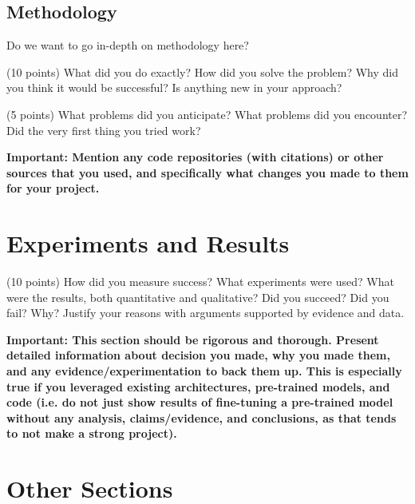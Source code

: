 \documentclass[10pt,twocolumn,letterpaper]{article}
\begin{document}
\subsection{Methodology}

Do we want to go in-depth on methodology here?

(10 points) What did you do exactly? How did you solve the problem? Why did you think it would be successful? Is anything new in your approach? 

(5 points) What problems did you anticipate? What problems did you encounter? Did the very first thing you tried work? 

\textbf{Important: Mention any code repositories (with citations) or other sources that you used, and specifically what changes you made to them for your project. }

\section{Experiments and Results}

(10 points) How did you measure success? What experiments were used? What were the results, both quantitative and qualitative? Did you succeed? Did you fail? Why? Justify your reasons with arguments supported by evidence and data.

\textbf{Important: This section should be rigorous and thorough. Present detailed information about decision you made, why you made them, and any evidence/experimentation to back them up. This is especially true if you leveraged existing architectures, pre-trained models, and code (i.e. do not just show results of fine-tuning a pre-trained model without any analysis, claims/evidence, and conclusions, as that tends to not make a strong project). }

\section{Other Sections}
\end{document}
